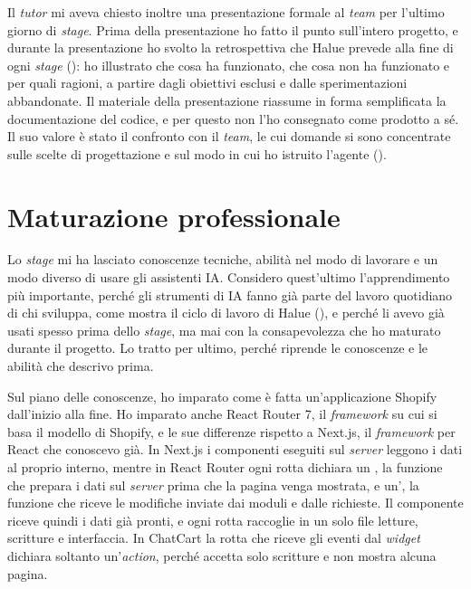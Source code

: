 Il \emph{tutor} mi aveva chiesto inoltre una presentazione formale al \emph{team} per l’ultimo
giorno di \emph{stage}. Prima della presentazione ho fatto il punto sull’intero progetto, e durante
la presentazione ho svolto la retrospettiva che Halue prevede alla fine di ogni \emph{stage}
(): ho illustrato che cosa ha funzionato, che cosa non ha funzionato e
per quali ragioni, a partire dagli obiettivi esclusi e dalle sperimentazioni abbandonate. Il
materiale della presentazione riassume in forma semplificata la documentazione del codice, e per
questo non l’ho consegnato come prodotto a sé. Il suo valore è stato il confronto con il
\emph{team}, le cui domande si sono concentrate sulle scelte di progettazione e sul modo in cui ho
istruito l’agente ().

\section{Maturazione professionale}
\label{sec:maturazione}

Lo \emph{stage} mi ha lasciato conoscenze tecniche, abilità nel modo di lavorare e un modo diverso
di usare gli assistenti IA. Considero quest’ultimo l’apprendimento più importante, perché gli
strumenti di IA fanno già parte del lavoro quotidiano di chi sviluppa, come mostra il ciclo di
lavoro di Halue (), e perché li avevo già usati spesso prima dello
\emph{stage}, ma mai con la consapevolezza che ho maturato durante il progetto. Lo tratto per
ultimo, perché riprende le conoscenze e le abilità che descrivo prima.

Sul piano delle conoscenze, ho imparato come è fatta un’applicazione Shopify dall’inizio alla fine.
Ho imparato anche React Router 7, il \emph{framework} su cui si basa il modello di Shopify, e le sue
differenze rispetto a Next.js, il \emph{framework} per React che conoscevo già. In Next.js i
componenti eseguiti sul \emph{server} leggono i dati al proprio interno, mentre in React Router ogni
rotta dichiara un , la funzione che prepara i dati sul \emph{server}
prima che la pagina venga mostrata, e un’, la funzione che riceve le
modifiche inviate dai moduli e dalle richieste. Il componente riceve quindi i dati già pronti, e
ogni rotta raccoglie in un solo file letture, scritture e interfaccia. In ChatCart la rotta che
riceve gli eventi dal \emph{widget} dichiara soltanto un’\emph{action}, perché accetta solo
scritture e non mostra alcuna pagina.

